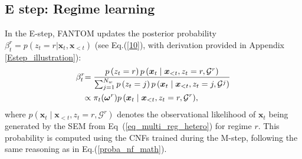 \subsection{E step: Regime learning}
\label{sec_Estep}
In the E-step, FANTOM updates the posterior probability $\beta^r_{t} = p( z_t = r  | \boldsymbol{x}_t, \boldsymbol{x}_{<t})$ (see Eq.(\ref{10}), with derivation provided in Appendix \ref{Estep_illustration}):
\begin{equation}
\begin{aligned}
\textcolor{black}{\beta^r_{t}} & \textcolor{black}{=\frac{p\left(z_{t}=r\right) p\left(\boldsymbol{x}_t \mid \boldsymbol{x}_{<t}, z_{t}=r, \mathcal{G}^r\right)}{\sum_{j=1}^{N_w} p\left(z_{t}=j\right) p\left(\boldsymbol{x}_t \mid \boldsymbol{x}_{<t}, z_{t}=j, \mathcal{G}^j\right)}} \\
& \textcolor{black}{\propto \pi_t(\boldsymbol{\omega}^{r}) p\left(\boldsymbol{x}_t \mid \boldsymbol{x}_{<t}, z_{t}=r, \mathcal{G}^r\right)},
\end{aligned}
\label{10}
\end{equation}
where $p(\boldsymbol{x}_t \mid \boldsymbol{x}_{<t}, z_{t} = r, \mathcal{G}^r)$ denotes the observational likelihood of $\boldsymbol{x}_t$ being generated by the SEM from Eq~(\ref{eq_multi_reg_hetero}) for regime $r$. This probability is computed using the CNFs trained during the M-step, following the same reasoning as in Eq.(\ref{proba_nf_math}).

